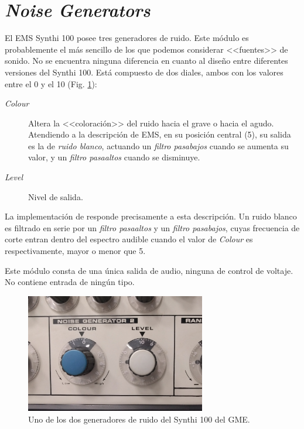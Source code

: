 \section{\textit{Noise Generators}}

El EMS Synthi 100 posee tres generadores de ruido. Este módulo es probablemente el más sencillo de los que podemos considerar <<fuentes>> de sonido. No se encuentra ninguna diferencia en cuanto al diseño entre diferentes versiones del Synthi 100. Está compuesto de dos diales, ambos con los valores entre el 0 y el 10 (Fig. \ref{fig:noise_generator}):

\begin{description}
	\item[\textit{Colour}] Altera la <<coloración>> del ruido hacia el grave o hacia el agudo. Atendiendo a la descripción de EMS, en su posición central (5), su salida es la de \textit{ruido blanco}, actuando un \textit{filtro pasabajos} cuando se aumenta su valor, y un \textit{filtro pasaaltos} cuando se disminuye.
	\item[\textit{Level}] Nivel de salida.
\end{description}

La implementación de \className responde precisamente a esta descripción. Un ruido blanco es filtrado en serie por un \textit{filtro pasaaltos} y un \textit{filtro pasabajos}, cuyas frecuencia de corte entran dentro del espectro audible cuando el valor de \textit{Colour} es respectivamente, mayor o menor que 5.

Este módulo consta de una única salida de audio, ninguna de control de voltaje. No contiene entrada de ningún tipo.

\begin{figure}
	\centering
	\includegraphics[width=0.7\textwidth]{images/noise_generator}
	\caption{Uno de los dos generadores de ruido del Synthi 100 del GME.}
	\label{fig:noise_generator}
\end{figure}